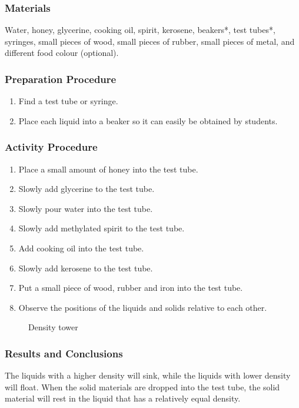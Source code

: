 \subsubsection*{Materials}
Water, honey, glycerine, cooking oil, spirit, kerosene, beakers*, test tubes*, syringes, small pieces of wood, small pieces of rubber, small pieces of metal, and different food colour (optional).

\subsubsection*{Preparation Procedure}
\begin{enumerate}
\item{Find a test tube or syringe.}
\item{Place each liquid into a beaker so it can easily be obtained by students.} 
\end{enumerate}

\subsubsection*{Activity Procedure}
\begin{enumerate}
\item{Place a small amount of honey into the test tube.} 
\item{Slowly add glycerine to the test tube.} 
\item{Slowly pour water into the test tube.} 
\item{Slowly add methylated spirit to the test tube.} 
\item{Add cooking oil into the test tube.} 
\item{Slowly add kerosene to the test tube.} 
\item{Put a small piece of wood, rubber and iron into the test tube.}
\item{Observe the positions of the liquids and solids relative to each other.}

\end{enumerate}
\begin{figure}[h]
\begin{center}
\def\svgwidth{200pt}

\caption{Density tower}
\label{fig:density-tower}
\end{center}
\end{figure}

\subsubsection*{Results and Conclusions}
The liquids with a higher density will sink, while the liquids with lower density will float. When the solid materials are dropped into the test tube, the solid material will rest in the liquid that has a relatively equal density.  

